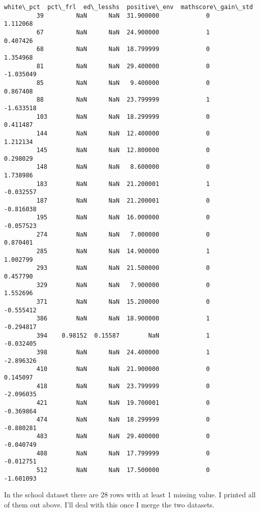 \documentclass[11pt]{article}
\begin{document}
\begin{Verbatim}[commandchars=\\\{\}]
              white\_pct  pct\_frl  ed\_lesshs  positive\_env  mathscore\_gain\_std  
         39         NaN      NaN  31.900000             0            1.112068  
         67         NaN      NaN  24.900000             1            0.407426  
         68         NaN      NaN  18.799999             0            1.354968  
         81         NaN      NaN  29.400000             0           -1.035049  
         85         NaN      NaN   9.400000             0            0.867408  
         88         NaN      NaN  23.799999             1           -1.633518  
         103        NaN      NaN  18.299999             0            0.411487  
         144        NaN      NaN  12.400000             0            1.212134  
         145        NaN      NaN  12.800000             0            0.298029  
         148        NaN      NaN   8.600000             0            1.738986  
         183        NaN      NaN  21.200001             1           -0.032557  
         187        NaN      NaN  21.200001             0           -0.816038  
         195        NaN      NaN  16.000000             0           -0.057523  
         274        NaN      NaN   7.000000             0            0.870401  
         285        NaN      NaN  14.900000             1            1.002799  
         293        NaN      NaN  21.500000             0            0.457790  
         329        NaN      NaN   7.900000             0            1.552696  
         371        NaN      NaN  15.200000             0           -0.555412  
         386        NaN      NaN  18.900000             1           -0.294817  
         394    0.98152  0.15587        NaN             1           -0.032405  
         398        NaN      NaN  24.400000             1           -2.896326  
         410        NaN      NaN  21.900000             0            0.145097  
         418        NaN      NaN  23.799999             0           -2.096035  
         421        NaN      NaN  19.700001             0           -0.369864  
         474        NaN      NaN  18.299999             0           -0.880281  
         483        NaN      NaN  29.400000             0           -0.040749  
         488        NaN      NaN  17.799999             0           -0.012751  
         512        NaN      NaN  17.500000             0           -1.601093  
\end{Verbatim}
            
    In the school dataset there are 28 rows with at least 1 missing value. I
printed all of them out above. I'll deal with this once I merge the two
datasets.
\end{document}
